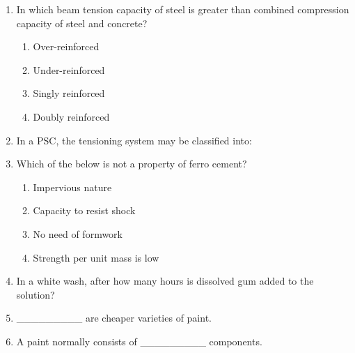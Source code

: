 \documentclass[11pt,a4paper]{article}
\begin{document}
\begin{enumerate}
\item{In which beam tension capacity of steel is greater than combined compression capacity of steel and concrete?}
\begin{enumerate}[label=\Alph*.]
\item{Over-reinforced}
\item{Under-reinforced}
\item{Singly reinforced}
\item{Doubly reinforced}
\end{enumerate}
\item{In a PSC, the tensioning system may be classified into:}
\\
\item{Which of the below is not a property of ferro cement?}
\begin{enumerate}[label=\Alph*.]
\item{Impervious nature}
\item{Capacity to resist shock}
\item{No need of formwork}
\item{Strength per unit mass is low}
\end{enumerate}
\item{In a white wash, after how many hours is dissolved gum added to the solution?}
\\
\item{\_\_\_\_\_\_\_\_\_ are cheaper varieties of paint.}
\\
\item{A paint normally consists of \_\_\_\_\_\_\_\_\_ components.}

\end{enumerate}
\end{document}
